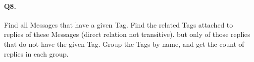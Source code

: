 \paragraph{Q8.}
Find all Messages that have a given Tag. Find the related Tags attached
to replies of these Messages (direct relation not transitive). but only
of those replies that do not have the given Tag.
Group the Tags by name, and get the count of replies in each group.

